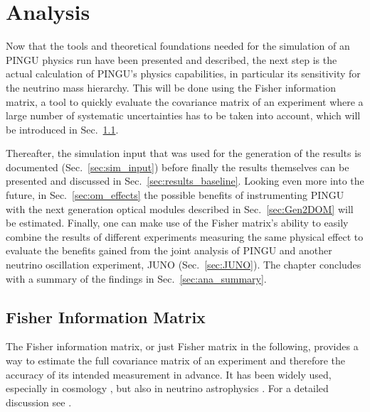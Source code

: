 \chapter{Analysis}
\label{sec:ana}

Now that the tools and theoretical foundations needed for the simulation of an
PINGU physics run have been presented and described, the next step is the
actual calculation of PINGU's physics capabilities, in particular its
sensitivity for the neutrino mass hierarchy. This will be done using the Fisher
information matrix, a tool to quickly evaluate the covariance matrix of an
experiment where a large number of systematic uncertainties has to be taken
into account, which will be introduced in Sec.~\ref{sec:fisher}.

Thereafter, the simulation input that was used for the generation of the
results is documented (Sec.~\ref{sec:sim_input}) before finally the results
themselves can be presented and discussed in Sec.~\ref{sec:results_baseline}.
Looking even more into the future, in Sec.~\ref{sec:om_effects} 
the possible benefits of instrumenting PINGU with the next generation optical
modules described in Sec.~\ref{sec:Gen2DOM} will be estimated. Finally, one can
make use of the
Fisher matrix's ability to easily combine the results of different experiments
measuring the same physical effect to evaluate the benefits gained from the
joint analysis of PINGU and another neutrino oscillation experiment, JUNO 
\cite{JUNO} (Sec.~\ref{sec:JUNO}). The chapter concludes with a
summary of the findings in Sec.~\ref{sec:ana_summary}.


\section{Fisher Information Matrix}
\label{sec:fisher}

The Fisher information matrix, or just Fisher matrix in the following, provides
a way to estimate the full covariance matrix of an experiment and therefore the
accuracy of its intended measurement in advance. It has been widely used,
especially in cosmology \cite{Fisher_first}, but also in neutrino
astrophysics \cite{MarekDiffuse}. For a detailed discussion see \eg
\cite{Fisher_first, DETF, DETF2}.

